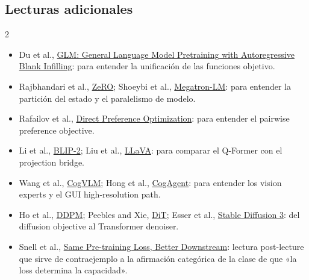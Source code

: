 \subsection{Lecturas adicionales}

\begin{multicols}{2}
\footnotesize
\begin{itemize}
  \setlength{\itemsep}{0.15em}
  \setlength{\parskip}{0pt}
  \item Du et al., \href{https://arxiv.org/abs/2103.10360}{GLM: General Language Model Pretraining with Autoregressive Blank Infilling}: para entender la unificación de las funciones objetivo.
  \item Rajbhandari et al., \href{https://arxiv.org/abs/1910.02054}{ZeRO}; Shoeybi et al., \href{https://arxiv.org/abs/1909.08053}{Megatron-LM}: para entender la partición del estado y el paralelismo de modelo.
  \item Rafailov et al., \href{https://arxiv.org/abs/2305.18290}{Direct Preference Optimization}: para entender el pairwise preference objective.
  \item Li et al., \href{https://arxiv.org/abs/2301.12597}{BLIP-2}; Liu et al., \href{https://arxiv.org/abs/2304.08485}{LLaVA}: para comparar el Q-Former con el projection bridge.
  \item Wang et al., \href{https://arxiv.org/abs/2311.03079}{CogVLM}; Hong et al., \href{https://arxiv.org/abs/2312.08914}{CogAgent}: para entender los vision experts y el GUI high-resolution path.
  \item Ho et al., \href{https://arxiv.org/abs/2006.11239}{DDPM}; Peebles and Xie, \href{https://arxiv.org/abs/2212.09748}{DiT}; Esser et al., \href{https://arxiv.org/abs/2403.03206}{Stable Diffusion 3}: del diffusion objective al Transformer denoiser.
  \item Snell et al., \href{https://arxiv.org/abs/2409.01236}{Same Pre-training Loss, Better Downstream}: lectura post-lecture que sirve de contraejemplo a la afirmación categórica de la clase de que «la loss determina la capacidad».
\end{itemize}
\end{multicols}


